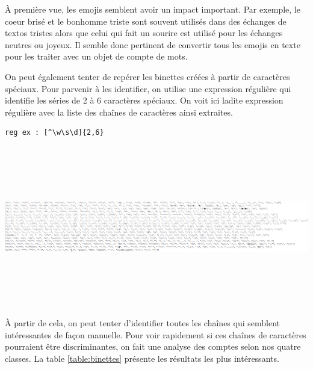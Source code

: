 
À première vue, les emojis semblent avoir un impact important. Par exemple, le coeur brisé et le bonhomme triste sont souvent utilisés dans des échanges de textos tristes alors que celui qui fait un sourire est utilisé pour les échanges neutres ou joyeux. Il semble donc pertinent de convertir tous les emojis en texte pour les traiter avec un objet de compte de mots.

On peut également tenter de repérer les binettes créées à partir de caractères spéciaux. Pour parvenir à les identifier, on utilise une expression régulière qui identifie les séries de 2 à 6 caractères spéciaux. On voit ici ladite expression régulière avec la liste des chaînes de caractères ainsi extraites.
\begin{verbatim}
reg ex : [^\w\s\d]{2,6}
\end{verbatim}

\includegraphics[width=\linewidth,height=7cm]{images/analyse_list_car_speciaux}

À partir de cela, on peut tenter d'identifier toutes les chaînes qui semblent intéressantes de façon manuelle. Pour voir rapidement si ces chaînes de caractères pourraient être discriminantes, on fait une analyse des comptes selon nos quatre classes. La table \ref{table:binettes} présente les résultats les plus intéressants.

